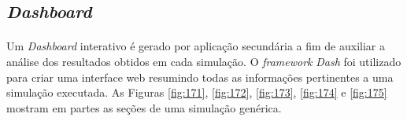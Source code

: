 \begin{center}
{\begin{longtable}[m]{| m{11em} | m{21em} |}

    \end{longtable}}
\end{center}




\FloatBarrier
\subsection{\textit{Dashboard}}

\paragraph{} Um \textit{Dashboard} interativo é gerado por aplicação secundária a fim de auxiliar a análise dos resultados obtidos em cada simulação. O \textit{framework} \textit{Dash} \cite{dash} foi utilizado para criar uma interface web resumindo todas as informações pertinentes a uma simulação executada. As Figuras \ref{fig:171}, \ref{fig:172}, \ref{fig:173}, \ref{fig:174} e \ref{fig:175} mostram em partes as seções de uma simulação genérica.

